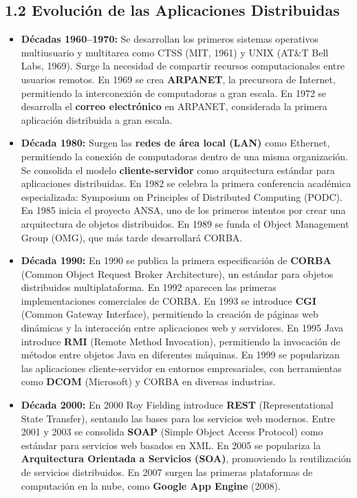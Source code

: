 \documentclass[a4paper,12pt]{article}
\begin{document}
\subsection*{1.2 Evolución de las Aplicaciones Distribuidas}
\begin{itemize}
    \item \textbf{Décadas 1960–1970:} Se desarrollan los primeros sistemas operativos multiusuario y multitarea como CTSS (MIT, 1961) y UNIX (AT\&T Bell Labs, 1969). Surge la necesidad de compartir recursos computacionales entre usuarios remotos. En 1969 se crea \textbf{ARPANET}, la precursora de Internet, permitiendo la interconexión de computadoras a gran escala. En 1972 se desarrolla el \textbf{correo electrónico} en ARPANET, considerada la primera aplicación distribuida a gran escala.
    
    \item \textbf{Década 1980:} Surgen las \textbf{redes de área local (LAN)} como Ethernet, permitiendo la conexión de computadoras dentro de una misma organización. Se consolida el modelo \textbf{cliente-servidor} como arquitectura estándar para aplicaciones distribuidas. En 1982 se celebra la primera conferencia académica especializada: Symposium on Principles of Distributed Computing (PODC). En 1985 inicia el proyecto ANSA, uno de los primeros intentos por crear una arquitectura de objetos distribuidos. En 1989 se funda el Object Management Group (OMG), que más tarde desarrollará CORBA.
    
    \item \textbf{Década 1990:} En 1990 se publica la primera especificación de \textbf{CORBA} (Common Object Request Broker Architecture), un estándar para objetos distribuidos multiplataforma. En 1992 aparecen las primeras implementaciones comerciales de CORBA. En 1993 se introduce \textbf{CGI} (Common Gateway Interface), permitiendo la creación de páginas web dinámicas y la interacción entre aplicaciones web y servidores. En 1995 Java introduce \textbf{RMI} (Remote Method Invocation), permitiendo la invocación de métodos entre objetos Java en diferentes máquinas. En 1999 se popularizan las aplicaciones cliente-servidor en entornos empresariales, con herramientas como \textbf{DCOM} (Microsoft) y CORBA en diversas industrias.
    
    \item \textbf{Década 2000:} En 2000 Roy Fielding introduce \textbf{REST} (Representational State Transfer), sentando las bases para los servicios web modernos. Entre 2001 y 2003 se consolida \textbf{SOAP} (Simple Object Access Protocol) como estándar para servicios web basados en XML. En 2005 se populariza la \textbf{Arquitectura Orientada a Servicios (SOA)}, promoviendo la reutilización de servicios distribuidos. En 2007 surgen las primeras plataformas de computación en la nube, como \textbf{Google App Engine} (2008).
    

\end{itemize}
\end{document}
